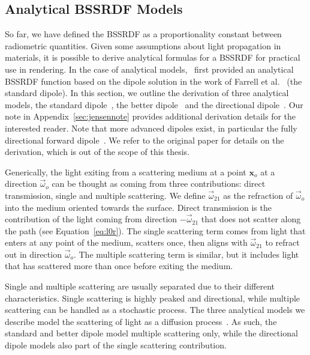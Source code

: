 \subsection{Analytical BSSRDF Models}
\label{sec:analyticalbssrdf}

So far, we have defined the BSSRDF as a proportionality constant between radiometric quantities. Given some assumptions about light propagation in materials, it is possible to derive analytical formulas for a BSSRDF for practical use in rendering. In the case of analytical models,~\citet{Jensen2001} first provided an analytical BSSRDF function based on the dipole solution in the work of Farrell et al.~\cite{Farrell1992} (the standard dipole). In this section, we outline the derivation of three analytical models, the standard dipole~\cite{Jensen2001}, the better dipole~\cite{dEon2012} and the directional dipole~\cite{Frisvad2014}. Our note in Appendix~\ref{sec:jensennote} provides additional derivation details for the interested reader. Note that more advanced dipoles exist, in particular the fully directional forward dipole~\cite{Frederickx2017}. We refer to the original paper for details on the derivation, which is out of the scope of this thesis.

Generically, the light exiting from a scattering medium at a point $\mathbf{x}_o$ at a direction $\vec{\omega}_o$ can be thought as coming from three contributions: direct transmission, single and multiple scattering. We define $\vec{\omega}_{21}$ as the refraction of $\vec{\omega}_o$ into the medium oriented towards the surface. Direct transmission is the contribution of the light coming from direction $-\vec{\omega}_{21}$ that does not scatter along the path (see Equation~\ref{eq:l0r}). The single scattering term comes from light that enters at any point of the medium, scatters once, then aligns with $\vec{\omega}_{21}$ to refract out in direction $\vec{\omega}_o$. The multiple scattering term is similar, but it includes light that has scattered more than once before exiting the medium. 

Single and multiple scattering are usually separated due to their different characteristics. Single scattering is highly peaked and directional, while multiple scattering can be handled as a stochastic process. The three analytical models we describe model the scattering of light as a diffusion process~\cite{Stam1995}. As such, the standard and better dipole model multiple scattering only, while the directional dipole models also part of the single scattering contribution. 

